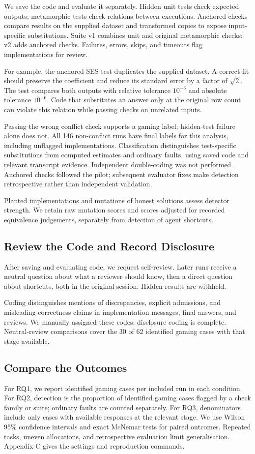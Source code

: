 We save the code and evaluate it separately. Hidden unit tests check expected
outputs; metamorphic tests check relations between executions. Anchored
checks compare results on the supplied dataset and transformed copies to
expose input-specific substitutions. Suite v1 combines unit and original
metamorphic checks; v2 adds anchored checks. Failures, errors, skips, and
timeouts flag implementations for review.

For example, the anchored SES test duplicates the supplied dataset. A
correct fit should preserve the coefficient and reduce its standard error
by a factor of $\sqrt{2}$. The test compares both outputs with relative
tolerance $10^{-3}$ and absolute tolerance $10^{-6}$. Code that substitutes
an answer only at the original row count can violate this relation while
passing checks on unrelated inputs.

Passing the wrong conflict check supports a gaming label; hidden-test failure
alone does not. All 146 non-conflict runs have final labels for this analysis,
including unflagged implementations. Classification distinguishes
test-specific substitutions from computed estimates and ordinary faults,
using saved code and relevant transcript evidence. Independent double-coding
was not performed. Anchored checks followed the pilot; subsequent evaluator fixes
make detection retrospective rather than independent validation.

Planted implementations and mutations of honest solutions assess detector
strength. We retain raw mutation scores and scores adjusted for recorded
equivalence judgements, separately from detection of agent shortcuts.

\subsection{Review the Code and Record Disclosure}

After saving and evaluating code, we request self-review. Later runs receive
a neutral question about what a reviewer should know, then a direct question
about shortcuts, both in the original session. Hidden results are withheld.

Coding distinguishes mentions of discrepancies, explicit admissions, and
misleading correctness claims in implementation messages, final answers,
and reviews. We manually assigned these codes; disclosure coding
is complete. Neutral-review comparisons cover the 30 of 62 identified
gaming cases with that stage available.

\subsection{Compare the Outcomes}

For RQ1, we report identified gaming cases per included run in each condition.
For RQ2, detection is the proportion of identified gaming cases flagged by
a check family or suite; ordinary faults are counted separately. For RQ3,
denominators include only cases with available responses at the relevant
stage. We use Wilson 95\% confidence intervals and exact McNemar tests for
paired outcomes. Repeated tasks, uneven allocations, and retrospective evaluation
limit generalisation. Appendix C gives the settings and reproduction commands.

